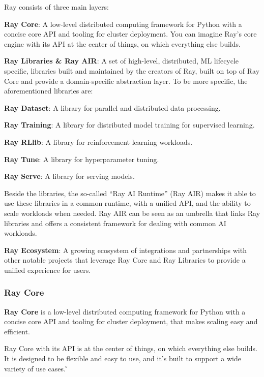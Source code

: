 Ray consists of three main layers:
\bit
\item \textbf{Ray Core}: A low-level distributed computing framework for Python with a concise core API and tooling 
for cluster deployment. You can imagine Ray's core engine with its API at the center of things, on which everything
else builds.
\item \textbf{Ray Libraries \& Ray AIR}: A set of high-level, distributed, ML lifecycle specific, libraries built and
maintained by the creators of Ray, built on top of Ray Core and provide a domain-specific abstraction layer. To be more
specific, the aforementioned libraries are:
\bit
\item{\textbf{Ray Dataset}}: A library for parallel and distributed data processing.
\item{\textbf{Ray Training}}: A library for distributed model training for supervised learning.
\item{\textbf{Ray RLlib}}: A library for reinforcement learning workloads.
\item{\textbf{Ray Tune}}: A library for hyperparameter tuning.
\item{\textbf{Ray Serve}}: A library for serving models.
\eit

Beside the libraries, the so-called ``Ray AI Runtime'' (Ray AIR) makes it able to use these libraries in a common
runtime, with a unified API, and the ability to scale workloads when needed. Ray AIR can be seen as an umbrella that
links Ray libraries and offers a consistent framework for dealing with common AI workloads.


\item \textbf{Ray Ecosystem}: A growing ecosystem of integrations and partnerships with other notable projects that
leverage Ray Core and Ray Libraries to provide a unified experience for users.
\eit

\subsubsection{Ray Core}

\textbf{Ray Core} is a low-level distributed computing framework for Python with a concise core API and tooling
for cluster deployment, that makes scaling easy and efficient.
\ed

Ray Core with its API is at the center of things, on which everything else builds. It is designed to be flexible and
easy to use, and it's built to support a wide variety of use cases. \v

